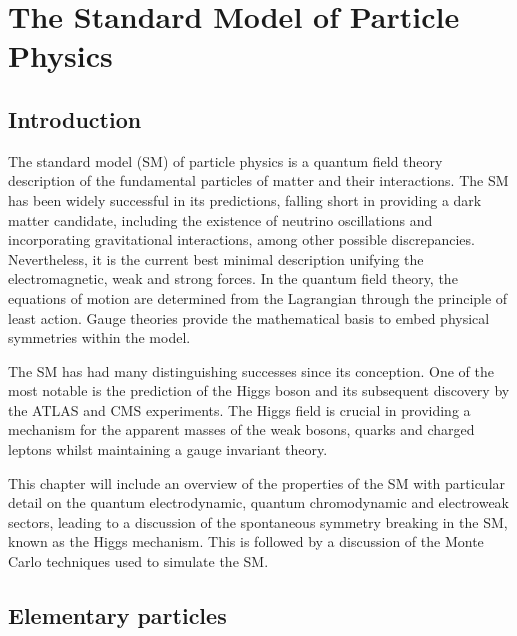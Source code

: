 \chapter{The Standard Model of Particle Physics}
\label{chap:theory}


\section{Introduction}

The standard model (SM) of particle physics is a quantum field theory
description of the fundamental particles of matter and their interactions. The
SM has been widely successful in its predictions, falling short in providing a
dark matter candidate, including the existence of neutrino oscillations and
incorporating gravitational interactions, among other possible discrepancies.
Nevertheless, it is the current best minimal description unifying the
electromagnetic, weak and strong forces. In the quantum field theory, the
equations of motion are determined from the Lagrangian through the principle
of least action. Gauge theories provide the mathematical basis to embed
physical symmetries within the model. 

The SM has had many distinguishing successes since its conception. One of
the most notable is the prediction of the Higgs boson
\cite{PhysRevLett.13.321,PhysRevLett.13.508,PhysRevLett.13.585} and its
subsequent discovery by the ATLAS \cite{Aad:2012tfa} and CMS
\cite{Chatrchyan:2012xdj} experiments. The Higgs field is crucial in providing
a mechanism for the apparent masses of the weak bosons, quarks and charged
leptons whilst maintaining a gauge invariant theory.

This chapter will include an overview of the properties of the SM with
particular detail on the quantum electrodynamic, quantum chromodynamic and
electroweak sectors, leading to a discussion of the spontaneous symmetry breaking in the SM, known as the Higgs mechanism. This is followed
by a discussion of the Monte Carlo techniques used to simulate the SM.


\section{Elementary particles}

